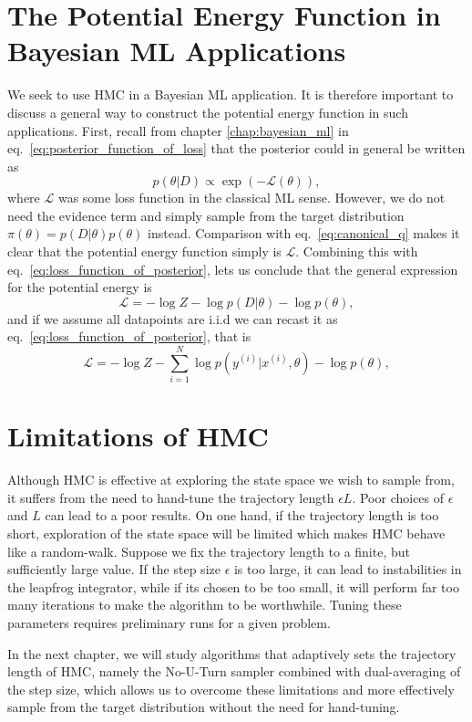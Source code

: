 \section{The Potential Energy Function in Bayesian ML Applications}
We seek to use HMC in a Bayesian ML application. It is therefore important to
discuss a general way to construct the potential energy function in such applications.
First, recall from chapter \ref{chap:bayesian_ml} in eq.~\eqref{eq:posterior_function_of_loss} that the posterior could in general be written as
\begin{equation}
  p(\theta|D) \propto \exp\left(-\mathcal{L}(\theta)\right),
\end{equation}
where $\mathcal{L}$ was some loss function in the classical ML sense.
However, we do not need the evidence term and simply sample from the target distribution $\pi(\theta) = p(D|\theta)p(\theta)$ instead.
Comparison with eq.~\eqref{eq:canonical_q} makes it clear that the potential energy
function simply is $\mathcal{L}$. Combining this with eq.~\eqref{eq:loss_function_of_posterior}, lets us conclude that the general expression
for the potential energy is
\begin{equation}
  \mathcal{L} = -\log Z - \log p(D|\theta) - \log p(\theta),
\end{equation}
and if we assume all datapoints are i.i.d we can recast it as eq.~\eqref{eq:loss_function_of_posterior}, that is
\begin{equation}
  \mathcal{L} = -\log Z - \sum_{i=1}^N \log p(y^{(i)}|x^{(i)}, \theta) - \log p(\theta),
\end{equation}

\section{Limitations of HMC}
Although HMC is effective at exploring the state space we wish to sample from, it suffers from the need to hand-tune
the trajectory length $\epsilon L$. Poor choices of $\epsilon$ and $L$ can lead to a poor results.
On one hand, if the trajectory length is too short, exploration of the state space will be limited 
which makes HMC behave like a random-walk. Suppose we fix the trajectory length to a finite,
but sufficiently large value.
If the step size $\epsilon$ is too large,
it can lead to instabilities in the leapfrog integrator, while if its chosen to be too small, it will perform far too many
iterations to make the algorithm to be worthwhile. 
Tuning these parameters requires preliminary runs for a given problem. 

In the next chapter, we will study algorithms that adaptively sets the trajectory length of HMC,
namely the No-U-Turn sampler combined with dual-averaging of the step size, which allows us to overcome these
limitations and more effectively sample from the target distribution without the need for hand-tuning.

